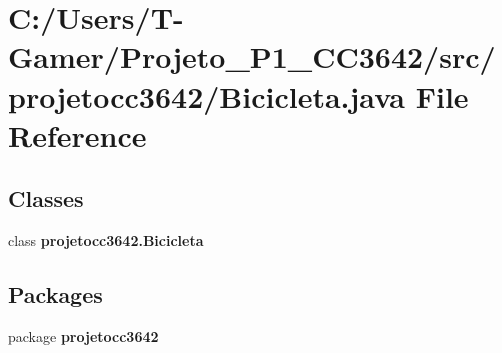 \section{C\+:/\+Users/\+T-\/\+Gamer/\+Projeto\+\_\+\+P1\+\_\+\+C\+C3642/src/projetocc3642/\+Bicicleta.java File Reference}
\label{_bicicleta_8java}
\subsection*{Classes}
\begin{DoxyCompactItemize}
\item 
class \textbf{ projetocc3642.\+Bicicleta}
\end{DoxyCompactItemize}
\subsection*{Packages}
\begin{DoxyCompactItemize}
\item 
package \textbf{ projetocc3642}
\end{DoxyCompactItemize}
